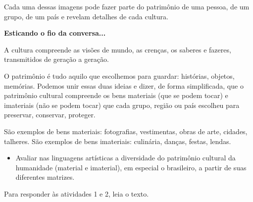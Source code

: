{Cada uma dessas imagens pode fazer parte do patrimônio de uma pessoa, de
um grupo, de um país e revelam detalhes de cada cultura.

\textbf{Esticando o fio da conversa...}

A cultura compreende as visões de mundo, as crenças, os saberes e
fazeres, transmitidos de geração a geração.

O patrimônio é tudo aquilo que escolhemos para guardar: histórias,
objetos, memórias. Podemos unir essas duas ideias e dizer, de forma
simplificada, que o patrimônio cultural compreende os bens materiais
(que se podem tocar) e imateriais (não se podem tocar) que cada grupo,
região ou país escolheu para preservar, conservar, proteger.

São exemplos de bens materiais: fotografias, vestimentas, obras de arte,
cidades, talheres. São exemplos de bens imateriais: culinária, danças,
festas, lendas.}



\begin{itemize}
\item Avaliar nas linguagens artísticas a diversidade do patrimônio cultural
da humanidade (material e imaterial), em especial o brasileiro, a partir
de suas diferentes matrizes.
\end{itemize}


Para responder às atividades 1 e 2, leia o texto.


